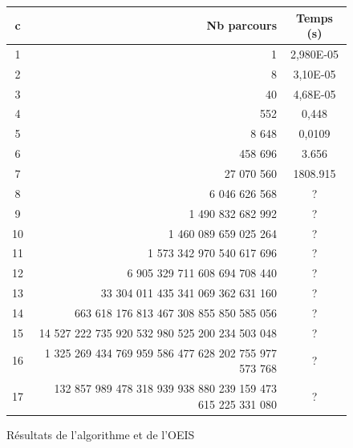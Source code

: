 \documentclass[twoside, a4paper, 12pt]{report}
\begin{document}
\begin{figure}[h]
\centering
\begin{tabular}{|c|r|c|}
\hline c & Nb parcours & Temps (s) \\
\hline 1 & 1 & 2,980E-05 \\
\hline 2 & 8 & 3,10E-05 \\
\hline 3 & 40 & 4,68E-05 \\
\hline 4 & 552 & 0,448 \\
\hline 5 & 8 648 & 0,0109 \\
\hline 6 & 458 696 & 3.656\\
\hline 7 & 27 070 560 & 1808.915 \\
\hline 8 & 6 046 626 568 & ? \\
\hline 9 &  1 490  832 682 992 & ? \\
\hline 10 & 1 460 089 659 025 264 & ? \\
\hline 11 & 1  573 342 970 540 617 696 & ? \\
\hline 12 & 6 905  329 711 608 694 708 440 & ? \\
\hline 13 & 33 304 011 435 341 069 362 631 160 & ? \\
\hline 14 & 663 618 176 813 467 308 855 850 585 056 & ? \\
\hline 15 & 14 527 222 735 920 532  980 525 200 234 503 048 & ? \\
\hline 16 & 1 325 269 434 769 959 586 477 628 202 755 977 573 768 & ? \\
\hline 17 & 132 857 989 478 318 939 938 880 239 159 473 615 225 331 080 & ? \\
\hline
\end{tabular}
\caption[Nombre de parcours]{Résultats de l'algorithme et de l'OEIS}
\label{tableau_resultats_serpent}
\end{figure}

\listoffigures
\setcounter{tocdepth}{5}
\tableofcontents
\end{document}
